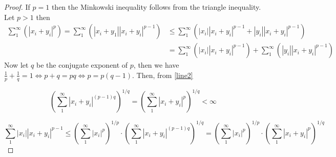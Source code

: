 \begin{proof}
    If $p=1$ then the Minkowski inequality follows from the
    triangle inequality. Let $p>1$ then
    \begin{align}\sum_{1}^{\infty}{\left(|x_{i} + y_{i}|^p\right)}=
    \sum_{1}^{\infty}{\left(|x_i+y_1||x_{i} + y_{i}|^{p-1}\right)}
    &\leq\sum_{1}^{\infty}{\left(|x_i||x_{i} + y_{i}|^{p-1}
    +|y_i||x_{i} + y_{i}|^{p-1}\right)}\\
    &=\sum_{1}^{\infty}{\left(|x_i||x_{i} + y_{i}|^{p-1}\right)}
    +\sum_{1}^{\infty}{\left(|y_i||x_{i} + y_{i}|^{p-1}\right)}
    \label{line2}
    \end{align}
    Now let $q$ be the conjugate exponent of $p$, then we have
    $\frac{1}{p}+\frac{1}{q}=1 \iff p+q=pq \iff p=p(q-1)$. Then,
    from
    \ref{line2}

    $$\left(\sum_{1}^{\infty}{|x_i+y_i|^{(p-1)q}}\right)^{1/q}
    =\left(\sum_{1}^{\infty}{|x_i+y_i|^{p}}\right)^{1/q}
    <\infty$$

    $$\sum_{1}^{\infty}{|x_i||x_{i} + y_{i}|^{p-1}}
    \leq \left(\sum_{1}^{\infty}{|x_i|^p}\right)^{1/p}\cdot
    \left(\sum_{1}^{\infty}{|x_i+y_i|^{(p-1)q}}\right)^{1/q}
    =\left(\sum_{1}^{\infty}{|x_i|^p}\right)^{1/p}\cdot
    \left(\sum_{1}^{\infty}{|x_i+y_i|^{p}}\right)^{1/q}$$
\end{proof}